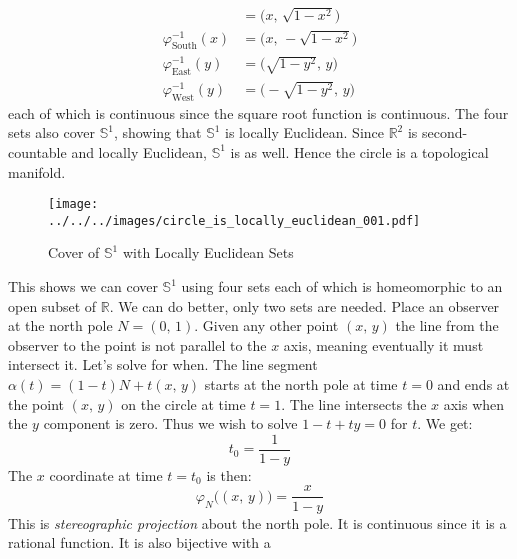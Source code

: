 \documentclass{article}
\theoremstyle{plain}
\theoremstyle{normal}
\newenvironment{example}{%
    \pushQED{\qed}\renewcommand{\qedsymbol}{$\blacksquare$}\examplex%
}{%
    \popQED\endexamplex%
}
\begin{document}
\begin{example}
\begin{align}
                &=\big(x,\,\sqrt{1-x^{2}}\big)\\
                \varphi_{\textrm{South}}^{-1}(x)
                &=\big(x,\,-\sqrt{1-x^{2}}\big)\\
                \varphi_{\textrm{East}}^{-1}(y)
                &=\big(\sqrt{1-y^{2}},\,y\big)\\
                \varphi_{\textrm{West}}^{-1}(y)
                &=\big(-\sqrt{1-y^{2}},\,y\big)
            \end{align}
            each of which is continuous since the square root function is
            continuous. The four sets also cover $\mathbb{S}^{1}$, showing that
            $\mathbb{S}^{1}$ is locally Euclidean. Since
            $\mathbb{R}^{2}$ is second-countable and locally Euclidean,
            $\mathbb{S}^{1}$ is as well. Hence the circle is a topological
            manifold.
        \end{example}
        \begin{figure}
            \centering
            \texttt{[image: ../../../images/circle\_is\_locally\_euclidean\_001.pdf]}
            \caption{Cover of $\mathbb{S}^{1}$ with Locally Euclidean Sets}
            \label{fig:circle_is_locally_euclidean_001}
        \end{figure}
        This shows we can cover $\mathbb{S}^{1}$ using four sets each of which
        is homeomorphic to an open subset of $\mathbb{R}$. We can do better,
        only two sets are needed. Place an observer at the north pole
        $N=(0,\,1)$. Given any other point $(x,\,y)$ the line from the
        observer to the point is not parallel to the $x$ axis, meaning
        eventually it must intersect it. Let's solve for when. The line segment
        $\alpha(t)=(1-t)N+t(x,\,y)$ starts at the north pole at time $t=0$ and
        ends at the point $(x,\,y)$ on the circle at time $t=1$. The line
        intersects the $x$ axis when the $y$ component is zero. Thus we wish
        to solve $1-t+ty=0$ for $t$. We get:
        \begin{equation}
            t_{0}=\frac{1}{1-y}
        \end{equation}
        The $x$ coordinate at time $t=t_{0}$ is then:
        \begin{equation}
            \varphi_{N}\big((x,\,y)\big)
            =\frac{x}{1-y}
        \end{equation}
        This is \textit{stereographic projection} about the north pole. It is
        continuous since it is a rational function. It is also bijective with a
\end{document}
